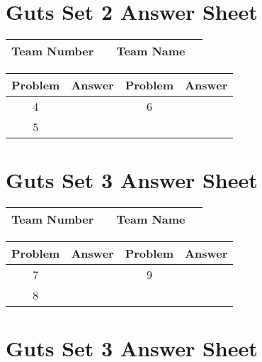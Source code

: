 \documentclass[14pt]{article}
\begin{document}
\vspace{30px}

\section*{Guts Set 2 Answer Sheet}

\begin{center}
\begin{tabular}{|r|r|r|r|}
\hline
	Team Number & \hspace{10em} &
	Team Name & \hspace{15em} \\ \hline
\end{tabular}
\end{center}
\begin{tabularx}{\textwidth}{|c|l|c|X|}\hline
	Problem & Answer & Problem & Answer \\\hline
	4 & \hspace{15em} & 6 & \\\hline
	5 & & & \\\hline
\end{tabularx}

\section*{Guts Set 3 Answer Sheet}

\begin{center}
\begin{tabular}{|r|r|r|r|}
\hline
	Team Number & \hspace{10em} &
	Team Name & \hspace{15em} \\ \hline
\end{tabular}
\end{center}
\begin{tabularx}{\textwidth}{|c|l|c|X|}\hline
	Problem & Answer & Problem & Answer \\\hline
	7 & \hspace{15em} & 9 & \\\hline
	8 & & & \\\hline
\end{tabularx}

\vspace{30px}

\section*{Guts Set 3 Answer Sheet}
\end{document}
